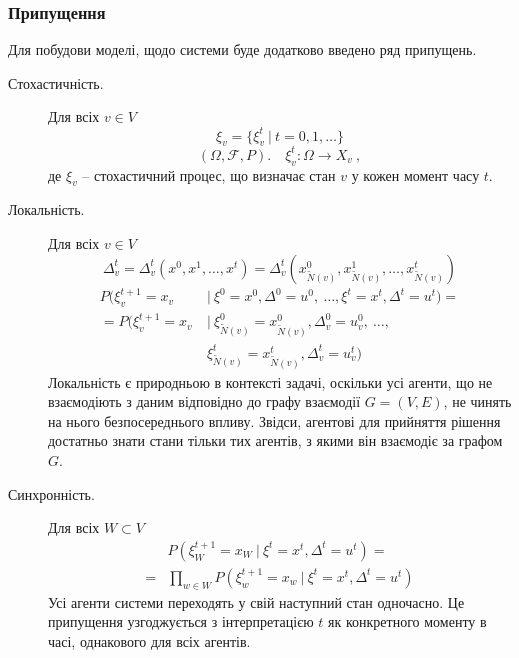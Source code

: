 \documentclass[oneside,14pt]{extarticle}
\begin{document}
\subsubsection{Припущення}

Для побудови моделі, щодо системи буде додатково введено ряд припущень.

\begin{description}

    \item[Стохастичність.] Для всіх \(v \in V\)
    \[ \xi_v = \{\xi^t_v\ |\ t = 0, 1, \ldots \}\] 
    \[ (\Omega, \mathcal{F}, P).\quad \xi_v^t : \Omega \rightarrow X_v\ ,\]
    де \( \xi_v \) – стохастичний процес, що визначає стан \(v\) у кожен момент часу \(t\). 
    \label{stochasticprocess}
    
    \item[Локальність.] Для всіх \(v \in V\) 
    \[\Delta_v^{t} = \Delta_v^{t}(x^0, x^1, \ldots, x^t) = \Delta_v^{t}(x_{\tilde{N}(v)}^0, x_{\tilde{N}(v)}^1, \ldots, x_{\tilde{N}(v)}^t)\]
    \begin{align*}
    P(\xi_v^{t+1} = x_v\ &|\ \xi^0 = x^0, \Delta^0 = u^0,\ \ldots, \xi^t = x^t, \Delta^t = u^t) = \\
	= P(\xi_v^{t+1} = x_v\ &|\ \xi_{\tilde N(v)}^0 = x_{\tilde N(v)}^0, \Delta_v^0 = u_v^0,\ \ldots,\\ &\xi_{\tilde N(v)}^t = x_{\tilde N(v)}^t, \Delta_v^t = u_v^t)
	\end{align*}
	Локальність є природньою в контексті задачі, оскільки усі агенти, що не взаємодіють з даним відповідно до графу взаємодії \(G = (V, E)\), не чинять на нього безпосереднього впливу. Звідси, агентові для прийняття рішення достатньо знати стани тільки тих агентів, з якими він взаємодіє за графом \(G\).
	
    \item[Синхронність.] Для всіх \(W \subset V\)
    \begin{align*}
    &P(\xi^{t+1}_W = x_W\ |\ \xi^t = x^t, \Delta^t = u^t) = \\
    = &\prod_{w \in W} P(\xi^{t+1}_w = x_w\ |\ \xi^t = x^t, \Delta^t = u^t)
    \end{align*}
    Усі агенти системи переходять у свій наступний стан одночасно. Це припущення узгоджується з інтерпретацією \(t\) як конкретного моменту в часі, однакового для всіх агентів.


\end{description}
\end{document}
